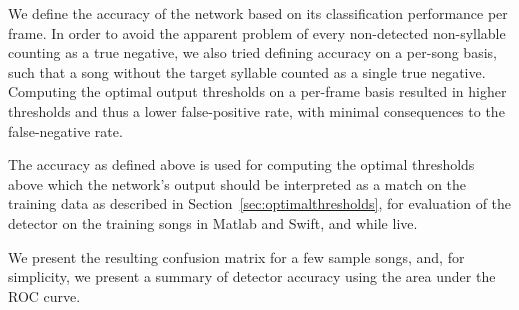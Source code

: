 \documentclass{article}
\let\oldmarginpar\marginpar
\renewcommand\marginpar[1]{\-\oldmarginpar[\raggedleft\footnotesize #1]
  {\raggedright\footnotesize #1}}
\newcommand\argmin{\mathop{\mbox{{\rm argmin}}}\limits}
\newcommand{\noprint}[1]{}
\begin{document}
We define the accuracy of the network based on its classification performance per frame. In order to avoid the apparent problem of every non-detected non-syllable counting as a true negative, we also tried defining accuracy on a per-song basis, such that a song without the target syllable counted as a single true negative.  Computing the optimal output thresholds on a per-frame basis resulted in higher thresholds and thus a lower false-positive rate, with minimal consequences to the false-negative rate.




The accuracy as defined above is used for computing the optimal thresholds above
which the network's output should be interpreted as a match on the
training data as described in Section~\ref{sec:optimalthresholds}, for
evaluation of the detector on the training songs in Matlab and Swift,
and while live.

We present the resulting confusion matrix for a few sample songs, and, for simplicity, we present a summary of detector accuracy using the area under the ROC curve.

\noprint{
Since the network
will output values $o_t$ between 0 and 1 at each moment $t$ in an
attempt to match the training output, the optimal threshold
$\tau\in[0,1]$ for the output neuron should be computed.  Given the
relative cost of false positives vs.~false negatives $C$, and the
acceptable time difference between target syllable and correct output
$\Delta t_d$, we compute the optimal threshold for an output element
according to the definitions above:
\begin{eqnarray*}
  \mbox{true positives}_\tau &=& \mbox{size of set}_{s\in \mbox{target songs}} o_t > \tau, \left| t \leq \Delta t_d \right| \\
  \mbox{false negatives}_\tau &=& \mbox{size of set} {s\in\mbox{target songs}} - \mbox{size of set} \mbox{true positives} \\
  \mbox{false positives}_\tau &=& \mbox{size of set}_{s\in \mbox{target songs}} o_t > \tau, \left| t > \Delta t_d \right| \\
  \widehat{\tau} &=& \argmin_\tau C\mbox{false positive} + \mbox{false negatives}
\end{eqnarray*}
}
\end{document}
